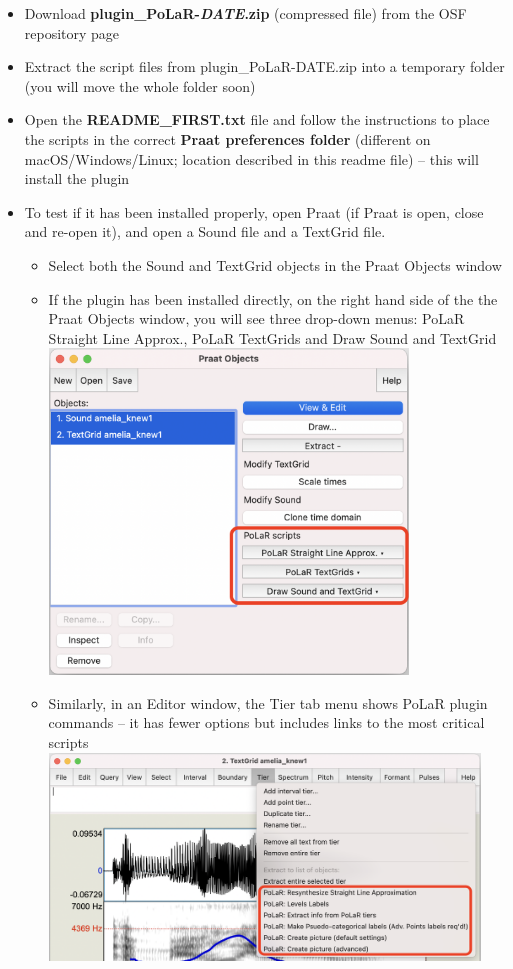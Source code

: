 \documentclass[11pt, twoside]{memoir}
\begin{document}
\begin{itemize}
	\item Download \textbf{plugin\_PoLaR-\textit{DATE}.zip} (compressed file) from the OSF repository page
	\item Extract the script files from plugin\_PoLaR-DATE.zip into a temporary folder (you will move the whole folder soon)
	\item Open the \textbf{README\_FIRST.txt} file and follow the instructions to place the scripts in the correct \textbf{Praat preferences folder} (different on macOS\slash Windows\slash Linux; location described in this readme file) – this will install the plugin
	\item To test if it has been installed properly, open Praat (if Praat is open, close and re-open it), and open a Sound file and a TextGrid file.
	\begin{itemize}
		\item Select both the Sound and TextGrid objects in the Praat Objects window
		\item If the plugin has been installed directly, on the right hand side of the the Praat Objects window, you will see three drop-down menus: PoLaR Straight Line Approx., PoLaR TextGrids and Draw Sound and TextGrid\\
			\includegraphics[width=3.75in]{Practical-Plugin-1-Objects-Window-Scripts.png}
		\item Similarly, in an Editor window, the Tier tab menu shows PoLaR plugin commands – it has fewer options but includes links to the most critical scripts\\
			\includegraphics[width=4.5in]{Practical-Plugin-2-Tier-Menu-Scripts.png}
	\end{itemize}
\end{itemize}
\end{document}
